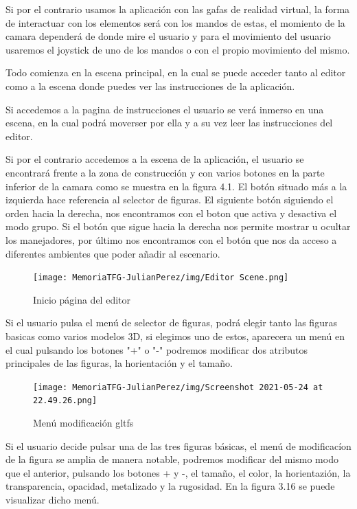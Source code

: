 \documentclass[a4paper, 12pt]{book}
\begin{document}
Si por el contrario usamos la aplicación con las gafas de realidad virtual, la forma de interactuar con los elementos será con los mandos de estas, el momiento de la camara dependerá de donde mire el usuario y  para el movimiento del usuario usaremos el joystick de uno de los mandos o con el propio movimiento del mismo.

Todo comienza en la escena principal, en la cual se puede acceder tanto al editor como a la escena donde puedes ver las instrucciones de la aplicación.

Si accedemos a la pagina de instrucciones el usuario se verá inmerso en una escena, en la cual podrá moverser por ella y a su vez leer las instrucciones del editor.

Si por el contrario accedemos a la escena de la aplicación, el usuario se encontrará frente a la zona de construcción y con varios botones en la parte inferior de la camara como se muestra en la figura 4.1. El botón situado más a la izquierda hace referencia al selector de figuras. El siguiente botón siguiendo el orden hacia la derecha, nos encontramos con el boton que activa y desactiva el modo grupo. Si el botón que sigue hacia la derecha nos permite mostrar u ocultar los manejadores, por último nos encontramos con el botón que nos da acceso a diferentes ambientes que poder añadir al escenario.

\begin{figure}[H]
  \centering
  \texttt{[image: MemoriaTFG-JulianPerez/img/Editor Scene.png]}
  \caption{Inicio página del editor}\label{home}
\end{figure}

Si el usuario pulsa el menú de selector de figuras, podrá elegir tanto las figuras basicas como varios modelos 3D, si elegimos uno de estos, aparecera un menú en el cual pulsando los botones "+" o "-" podremos modificar dos atributos principales de las figuras, la horientación y el tamaño.

\begin{figure}[H]
  \centering
  \texttt{[image: MemoriaTFG-JulianPerez/img/Screenshot 2021-05-24 at 22.49.26.png]}
  \caption{Menú modificación gltfs}\label{home}
\end{figure}

Si el usuario decide pulsar una de las tres figuras básicas, el menú de modificacíon de la figura se amplia de manera notable, podremos modificar del mismo modo que el anterior, pulsando los botones + y -, el tamaño, el color, la horientazión, la transparencia, opacidad, metalizado y la rugosidad. En la figura 3.16 se puede visualizar dicho menú.
\end{document}
